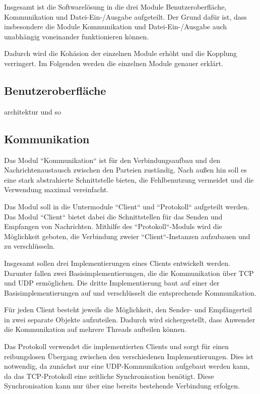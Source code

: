 \label{sc:architektur}

Insgesamt ist die Softwarelösung in die drei Module Benutzeroberfläche, Kommunikation und Datei-Ein-/Ausgabe aufgeteilt. Der Grund dafür ist, dass insbesondere die Module Kommunikation und Datei-Ein-/Ausgabe auch unabhängig voneinander funktionieren können.

Dadurch wird die Kohäsion der einzelnen Module erhöht und die Kopplung verringert. Im Folgenden werden die einzelnen Module genauer erklärt.

\subsection{Benutzeroberfläche}
architektur und so

\subsection{Kommunikation}
Das Modul “Kommunikation“ ist für den Verbindungsaufbau und den Nachrichtenaustausch zwischen den Parteien zuständig. Nach außen hin soll es eine stark abstrahierte Schnittstelle bieten, die Fehlbenutzung vermeidet und die Verwendung maximal vereinfacht.

Das Modul soll in die Untermodule “Client“ und “Protokoll“ aufgeteilt werden. Das Modul “Client“ bietet dabei die Schnittstellen für das Senden und Empfangen von Nachrichten. Mithilfe des “Protokoll“-Moduls wird die Möglichkeit geboten, die Verbindung zweier “Client“-Instanzen aufzubauen und zu verschlüsseln.

Insgesamt sollen drei Implementierungen eines Clients entwickelt werden. Darunter fallen zwei Basisimplementierungen, die die Kommunikation über TCP und UDP ermöglichen. Die dritte Implementierung baut auf einer der Basisimplementierungen auf und verschlüsselt die entsprechende Kommunikation.

Für jeden Client besteht jeweils die Möglichkeit, den Sender- und Empfängerteil in zwei separate Objekte aufzuteilen. Dadurch wird sichergestellt, dass Anwender die Kommunikation auf mehrere Threads aufteilen können.

Das Protokoll verwendet die implementierten Clients und sorgt für einen reibungslosen Übergang zwischen den verschiedenen Implementierungen. Dies ist notwendig, da zunächst nur eine UDP-Kommunikation aufgebaut werden kann, da das TCP-Protokoll eine zeitliche Synchronisation benötigt. Diese Synchronisation kann nur über eine bereits bestehende Verbindung erfolgen.


